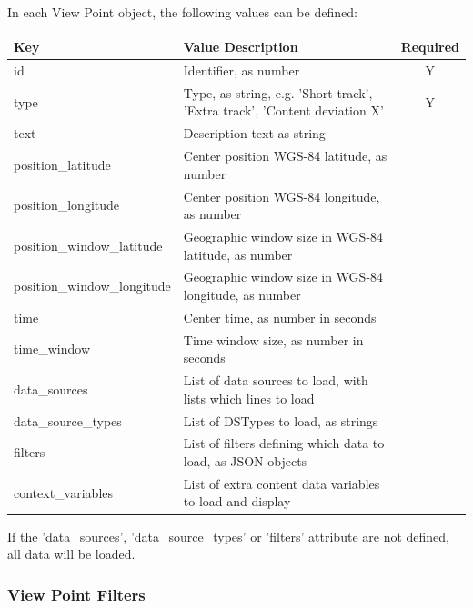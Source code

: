 In each View Point object, the following values can be defined:

\begin{center}
 \begin{table}[H]
  \begin{tabularx}{\textwidth}{ | l | X | c | }
    \hline
    \textbf{Key} & \textbf{Value Description} & \textbf{Required} \\ \hline
    id & Identifier, as number & Y \\ \hline
    type & Type, as string, e.g. 'Short track', 'Extra track', 'Content deviation X' & Y   \\ \hline
    text & Description text as string &    \\ \hline
    position\_latitude & Center position WGS-84 latitude, as number &    \\ \hline
    position\_longitude & Center position WGS-84 longitude, as number &    \\ \hline
    position\_window\_latitude & Geographic window size in WGS-84 latitude, as number &    \\ \hline
    position\_window\_longitude & Geographic window size in WGS-84 longitude, as number &    \\ \hline
    time & Center time, as number in seconds &    \\ \hline
    time\_window & Time window size, as number in seconds &    \\ \hline
    data\_sources & List of data sources to load, with lists which lines to load &    \\ \hline
    data\_source\_types & List of DSTypes to load, as strings &    \\ \hline
    filters & List of filters defining which data to load, as JSON objects &   \\ \hline
    context\_variables & List of extra content data variables to load and display &    \\ \hline
\end{tabularx}
\end{table}
\end{center}

If the 'data\_sources', 'data\_source\_types' or 'filters' attribute are not defined, all data will be loaded.

\subsubsection{View Point Filters}

